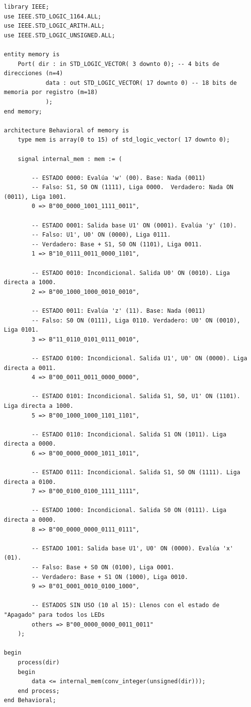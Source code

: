 \documentclass[12pt, letterpaper]{article}
\begin{document}
\begin{lstlisting}[style=vhdl, caption={Código completo de la memoria ROM.}, label={lst:memory}]
library IEEE;
use IEEE.STD_LOGIC_1164.ALL;
use IEEE.STD_LOGIC_ARITH.ALL;
use IEEE.STD_LOGIC_UNSIGNED.ALL;

entity memory is
	Port( dir : in STD_LOGIC_VECTOR( 3 downto 0); -- 4 bits de direcciones (n=4)
			data : out STD_LOGIC_VECTOR( 17 downto 0) -- 18 bits de memoria por registro (m=18)
			);
end memory;

architecture Behavioral of memory is
	type mem is array(0 to 15) of std_logic_vector( 17 downto 0);

	signal internal_mem : mem := (

		-- ESTADO 0000: Evalúa 'w' (00). Base: Nada (0011)
		-- Falso: S1, S0 ON (1111), Liga 0000.  Verdadero: Nada ON (0011), Liga 1001.
		0 => B"00_0000_1001_1111_0011",

		-- ESTADO 0001: Salida base U1' ON (0001). Evalúa 'y' (10).
		-- Falso: U1', U0' ON (0000), Liga 0111.
		-- Verdadero: Base + S1, S0 ON (1101), Liga 0011.
		1 => B"10_0111_0011_0000_1101",

		-- ESTADO 0010: Incondicional. Salida U0' ON (0010). Liga directa a 1000.
		2 => B"00_1000_1000_0010_0010",

		-- ESTADO 0011: Evalúa 'z' (11). Base: Nada (0011)
		-- Falso: S0 ON (0111), Liga 0110. Verdadero: U0' ON (0010), Liga 0101.
		3 => B"11_0110_0101_0111_0010",

		-- ESTADO 0100: Incondicional. Salida U1', U0' ON (0000). Liga directa a 0011.
		4 => B"00_0011_0011_0000_0000",

		-- ESTADO 0101: Incondicional. Salida S1, S0, U1' ON (1101). Liga directa a 1000.
		5 => B"00_1000_1000_1101_1101",

		-- ESTADO 0110: Incondicional. Salida S1 ON (1011). Liga directa a 0000.
		6 => B"00_0000_0000_1011_1011",

		-- ESTADO 0111: Incondicional. Salida S1, S0 ON (1111). Liga directa a 0100.
		7 => B"00_0100_0100_1111_1111",

		-- ESTADO 1000: Incondicional. Salida S0 ON (0111). Liga directa a 0000.
		8 => B"00_0000_0000_0111_0111",

		-- ESTADO 1001: Salida base U1', U0' ON (0000). Evalúa 'x' (01).
		-- Falso: Base + S0 ON (0100), Liga 0001.
		-- Verdadero: Base + S1 ON (1000), Liga 0010.
		9 => B"01_0001_0010_0100_1000",

		-- ESTADOS SIN USO (10 al 15): Llenos con el estado de "Apagado" para todos los LEDs
		others => B"00_0000_0000_0011_0011"
	);

begin
	process(dir)
	begin
		data <= internal_mem(conv_integer(unsigned(dir)));
	end process;
end Behavioral;
\end{lstlisting}
\end{document}
